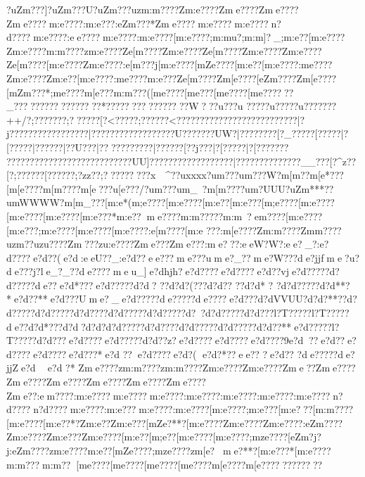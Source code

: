 {{{{{{{{{{{{{{{{{{{{{{{{{{{{{{{{{{{{{{{{{{{{{{{{{{{{{{{{{{{{{{{{{{{{{{{{{{{{{{{{{{{{{{{{{{{{{{{{{{{{{{{{{{{{{{{{{{{{{{{{{{{{{{{{{{{{{{{{{{{{{{{{{{{{{{{{{{{{{{{{{{{{{{{{{{{{{{{{{{{{{{{{{{{{{{{{{{{{{{{{{{{{{{{{{{{{{{{{{{{{{{{{{{{{{{{{{{{{{{{{{{{{{{{{{{{{{{{{{{{{{{{{{{{{{{{{{{{{{{{{{{{{{{{{{{{{{{{{{{{{{{{{{{{{{{{{{{{{{{{{{{{{{{{{{{{{{{{{{{{{{{{{{{{{{{{{{{{{{{{{{{{{{{{{{{{{{{{{{{{{{{{{{{{{{{{{{{{{{{{{{{{{{{{{{{{{{{{{{{{  ?uZm???]?uZm???U?uZm???uzm:m????Zm:e????Zme????Zme????Zme????m:e????:m:e???:eZm???*Zme????m:e????m:e????n?d????m:e????:ee????m:e????:m:e????[m:e????;m:mu}}?;m:m]?_;m:e??[m:e????Zm:e????{m:m????zm:e????Ze[m????Zm:e????Ze[m????Zm:e????Zm:e????Ze[m????[m:e????Zm:e????:e[m???j[m:e????[mZe????[m:e??[m:e????:m{e????Zm:e????Zm:e??[m:e????:m{e????{m:e???Ze[m????Zm[e????[eZm????Zm[e????[mZm???*;m{e????{m[e???{m:m???([m{e????[m{e???[m{e????[m{e??????}_?????}??????}??????}*????????  ??}??????}W??}?u   ??}?u ????}?u????}?u???????}++/?;???????;??????[?<?????\?;?????{?<?????{?\?????{?\?????{?\?????{?{???? {?|?j???{?????????{?????|?{???????{?????{?{????U{?{?    {?{?    ??{?UW}?|?{???????[?_?????[?????|?[?????|?{?????|?{?U???|?{????{?{?????|?{?????[?{?j???|?[?????|?[?????{?{?  
???{???????{?????????????????UU]??????????????????|?????????????{?__??{?[?^z??[?;?????{?[?????{?;?zz??;?????????x~~^??uxxxx?u{m???u{m???W?m[m??{m[e*???[m[e????{m[m????{m[e ???u[e???/?u{m???u{m_~?m[m????u{m?UUU?uZm***??u{mWWWW?m[m_???[m:e*(  {m;e????[m:e????[m:e??[m:e???[m;e????[m:e????[m:e????[m:e????[m:e???*{m:e??{me??? ?m:m?????m:m~?e{m????[m:e????[m:e???;m:e????[m:e????[m:e????:e[m????[m:e
???:m[e????Zm:m????Zm{m????{uzm??{uzu????}Zm???zu:e????Zme??? Zme}???:me???:eeW?W?:ee?_?:e?d????e?d ??(e?d   :eeU??_:e?d??ee?? ?me???ume?_??me?W???de?jjfme}?u?de???j?le_?_??de????meu_]e?dhjh?e?d????e?d????e?d??vje?d?????d?d?????de  ??e?d*???e?d?????d?d?
??d?d?(???d?d??
??d?d*
? ?d?d?????d?d**?*e?d??**e?d???Ume?{_e?d?????de?????de????e?d???d?dVVUU?d?d?**??d?d?????d?d?????d?d????d?d?????d?d?????d?\    ?d?d?????d?d???l?T?????l?T?????de   ??d?d*?? ?d?d   ?d?d    ?d?d?????d?d????d?d?????d?d?????d?d??**e?d?????l?T?????d?d??? e?d????e?d?????d?d??z?e?d????e?d????e?d????9e?d??e?d??e?d????e?d????e?d???*e?d
??e?d????e?d?(  e?d?*??ee??
?e?d??  ?de?????de?jjZe?d
  e?d
?*
Zme????zm:m????zm:m????Zm:e????Zm:e????Zme ??Zme????Zme????Zme????Zme????Zme????Zme????Zme??:em????:m:e????m:e????m:e????:m:e????:m:e????:m:e????:m:e????n?d????n?d????m:e????:m:e???m:e????:m:e????[m:e????;m:e???[m:e???[m:m????[m:e????[m:e??*?Zm:e??Zm:e???[mZe?**?[m:e????Zm:e????Zm:e????:eZm????Zm:e????Zm:e???Zm:e????[m:e??[m;e??[m:e????[m:e????;mze????[eZm?j?j:eZm????zm:e????{m:e??[mZe????;mze????zm[e?{me?**?[m:e???*[m:e????{m:m???{m:m??[m{e????[m{e????[m{e????[m{e????{m[e????{m[e??????}??????} 
}}}}}}}}}}}}}}}}}}}}}}}}}}}}}}}}}}}}}}}}}}}}}}}}}}}}}}}}}}}}}}}}}}}}}}}}}}}}}}}}}}}}}}}}}}}}}}}}}}}}}}}}}}}}}}}}}}}}}}}}}}}}}}}}}}}}}}}}}}}}}}}}}}}}}}}}}}}}}}}}}}}}}}}}}}}}}}}}}}}}}}}}}}}}}}}}}}}}}}}}}}}}}}}}}}}}}}}}}}}}}}}}}}}}}}}}}}}}}}}}}}}}}}}}}}}}}}}}}}}}}}}}}}}}}}}}}}}}}}}}}}}}}}}}}}}}}}}}}}}}}}}}}}}}}}}}}}}}}}}}}}}}}}}}}}}}}}}}}}}}}}}}}}}}}}}}}}}}}}}}}}}}}}}}}}}}}}}}}}}}}}}}}}}}}}}}}}}}}}}}}}}}}}}}}}}}}}}}}}}}}}}}}}}}}}}}}}}}}}}}}}}}}}}}}}}}}}}}}}}}}}}}}}}}}}}}
